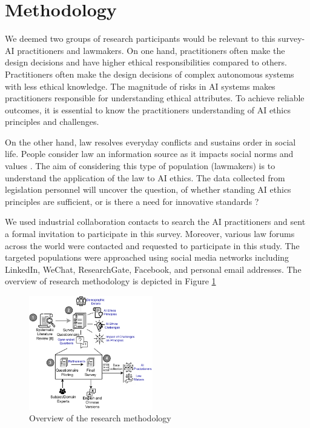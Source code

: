\section{Methodology} \label{SettingtheStage}
We deemed two groups of research participants would be relevant to this survey- AI practitioners and lawmakers.  On one hand, practitioners often make the design decisions and have higher ethical responsibilities compared to others. Practitioners often make the design decisions of complex autonomous systems with less ethical knowledge. The magnitude of risks in AI systems makes practitioners responsible for understanding ethical attributes. To achieve reliable outcomes, it is essential to know the practitioners understanding of AI ethics principles and challenges. 

On the other hand, law resolves everyday conflicts and sustains order in social life. People consider law an information source as it impacts social norms and values \cite{AR11}. The aim of considering this type of population (lawmakers) is to understand the application of the law to AI ethics. The data collected from legislation personnel will uncover the question, of whether standing AI ethics principles are sufficient, or is there a need for innovative standards \cite{AR11}? 

We used industrial collaboration contacts to search the AI practitioners and sent a formal invitation to participate in this survey. Moreover, various law forums across the world were contacted and requested to participate in this study. The targeted populations were approached using social media networks including LinkedIn, WeChat, ResearchGate, Facebook, and personal email addresses. The overview of research methodology is depicted in Figure \ref{fig:Research Methodology}

\begin{figure}[t]
 \centering
  \includegraphics[width=0.48\textwidth]{Figures/AI-Ethics-Method.drawio.pdf}
\caption{Overview of the research methodology}
\label{fig:Research Methodology}
\end{figure}

